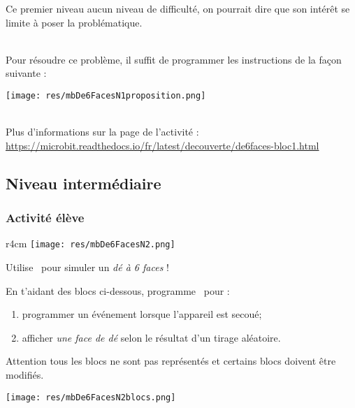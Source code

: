 Ce premier niveau aucun niveau de difficulté, on pourrait dire que son intérêt se limite à poser la problématique.

\begin{minipage}[t]{0.5\linewidth}
    \begin{methode}
    ~\\Pour résoudre ce problème, il suffit de programmer les instructions de la façon suivante :
    
    \texttt{[image: res/mbDe6FacesN1proposition.png]}
    \end{methode}
\end{minipage}
\hfill
\begin{minipage}[t]{0.5\linewidth}
    \begin{remarque}
    ~\\Plus d'informations sur la page de l'activité :\\ \url{https://microbit.readthedocs.io/fr/latest/decouverte/de6faces-bloc1.html}
    \end{remarque}
\end{minipage}






%
%
\newpage
\subsection{Niveau intermédiaire}
\subsubsection{Activité élève}



\begin{eleve}
	
	
\begin{wrapfigure}[7]{r}{4cm}
	\texttt{[image: res/mbDe6FacesN2.png]}
\end{wrapfigure}

Utilise \mb~pour simuler un \emph{dé à 6 faces} !

En t'aidant des blocs ci-dessous, programme \mb~pour : 
\begin{enumerate}
    \item programmer un événement lorsque l'appareil est secoué;
    \item afficher \emph{une face de dé} selon le résultat d'un tirage aléatoire.
\end{enumerate}
Attention tous les blocs ne sont pas représentés et certains blocs doivent être modifiés.

\texttt{[image: res/mbDe6FacesN2blocs.png]}

\end{eleve}

